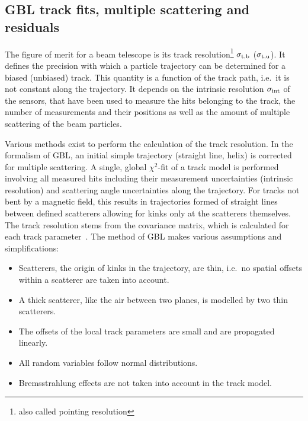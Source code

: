 \subsection{GBL track fits, multiple scattering and residuals}
\label{sec:resmultiple}

The figure of merit for a beam telescope is its track resolution\footnote{also called pointing resolution} $\sigma_{\textrm{t,b}}$ ($\sigma_{\textrm{t,u}}$).
It defines the precision with which a particle trajectory can be determined for a biased (unbiased) track. 
This quantity is a function of the track path, i.e.\ it is not constant along the trajectory. 
It depends on the intrinsic resolution $\sigma_{\textrm{int}}$ of the sensors, that have been used to measure the hits belonging to the track, the number of measurements and their positions
 as well as the amount of multiple scattering of the beam particles.
 
Various methods exist to perform the calculation of the track resolution. 
In the formalism of GBL, an initial simple trajectory (straight line, helix) is corrected for multiple scattering. 
A single, global $\chi^2$-fit of a track model is performed involving all measured hits including their measurement uncertainties (intrinsic resolution)
 and scattering angle uncertainties along the trajectory. 
For tracks not bent by a magnetic field, this results in trajectories formed of straight lines between defined scatterers allowing for kinks only at the scatterers themselves. 
The track resolution stems from the covariance matrix, which is calculated for each track parameter~\cite{Blobel20111760,Kleinwort-2012}. 
The method of GBL makes various assumptions and simplifications:

\begin{itemize}
 \item Scatterers, the origin of kinks in the trajectory, are thin, i.e.\ no spatial offsets within a scatterer are taken into account. 
 \item A thick scatterer, like the air between two planes, is modelled by two thin scatterers. 
 \item The offsets of the local track parameters are small and are propagated linearly. 
 \item All random variables follow normal distributions.
 \item Bremsstrahlung effects are not taken into account in the track model. 
\end{itemize}
 
